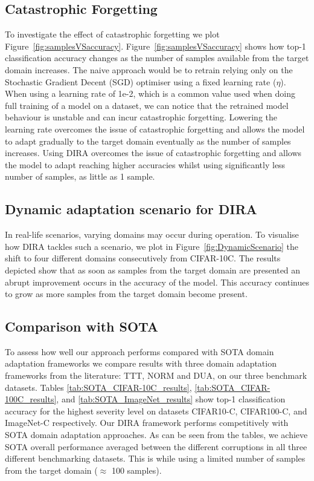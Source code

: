 \subsection{Catastrophic Forgetting}
To investigate the effect of catastrophic forgetting we plot Figure~\ref{fig:samplesVSaccuracy}. 
%
Figure~\ref{fig:samplesVSaccuracy} shows how top-1 classification accuracy changes as the number of samples available from the target domain increases. 
%
The naive approach would be to retrain relying only on the Stochastic Gradient Decent (SGD) optimiser using a fixed learning rate ($\eta$). 
%
When using a learning rate of 1e-2, which is a common value used when doing full training of a model on a dataset, we can notice that the retrained model behaviour is unstable and can incur catastrophic forgetting.
%
Lowering the learning rate overcomes the issue of catastrophic forgetting and allows the model to adapt gradually to the target domain eventually as the number of samples increases.
%
Using DIRA overcomes the issue of catastrophic forgetting and allows the model to adapt reaching higher accuracies whilst using significantly less number of samples, as little as 1 sample.


\subsection{Dynamic adaptation scenario for DIRA}
In real-life scenarios, varying domains may occur during operation. 
%
To visualise how DIRA tackles such a scenario, we plot in Figure~\ref{fig:DynamicScenario} the shift to four different domains consecutively from CIFAR-10C. 
%
The results depicted show that as soon as samples from the target domain are presented an abrupt improvement occurs in the accuracy of the model. This accuracy continues to grow as more samples from the target domain become present. 

\subsection{Comparison with SOTA}
To assess how well our approach performs compared with SOTA domain adaptation frameworks we compare results with three domain adaptation frameworks from the literature: TTT, NORM and DUA, on our three benchmark datasets. 
%
Tables \ref{tab:SOTA_CIFAR-10C_results}, \ref{tab:SOTA_CIFAR-100C_results}, and \ref{tab:SOTA_ImageNet_results} show top-1 classification accuracy for the highest severity level on datasets CIFAR10-C, CIFAR100-C, and ImageNet-C respectively.
%
Our DIRA framework performs competitively with SOTA domain adaptation approaches. 
%
As can be seen from the tables, we achieve SOTA overall performance averaged between the different corruptions in all three different benchmarking datasets. 
% 
This is while using a limited number of samples from the target domain ($\approx$ 100 samples).

